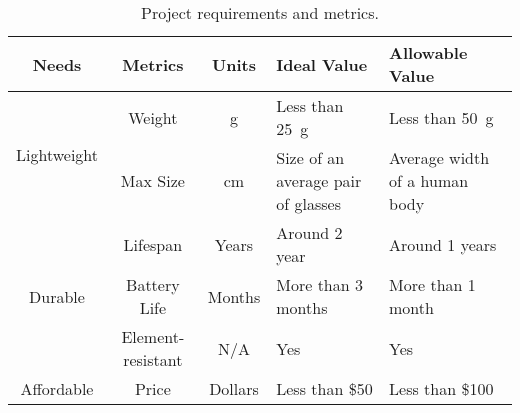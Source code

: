 \begin{table}
  \centering
  \begin{tabular}{| c | c | c | m{10.5em}| m{10.5em} |}\hline
    Needs & Metrics & Units & Ideal Value & Allowable Value\\\hline\hline
    \multirow{2}{*}{Lightweight}
          & Weight & \unit{\g} & Less than \qty{25}{\g} & Less than
                                                          \qty{50}{\g}\\\cline{2-5} 
          & Max Size & \unit{\cm}
                            & Size of an average pair of glasses
                                          & Average width of a human body\\\hline
    \multirow{3}{*}{Durable}
          & Lifespan & Years & Around 2 year & Around 1 years\\\cline{2-5}
          & Battery Life & Months & More than 3 months & More than 1 month\\\cline{2-5}
          & Element-resistant & N/A & Yes & Yes\\\hline
    Affordable & Price & Dollars & Less than \$50 & Less than \$100\\\hline
  \end{tabular}
  
  \caption{Project requirements and metrics.}
\end{table}

